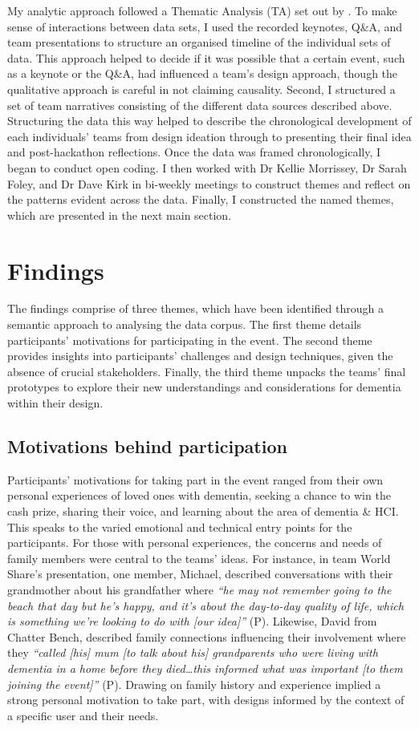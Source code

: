 My analytic approach followed a Thematic Analysis (TA) set out by \cite{braun_one_2020,braun_using_2006}. To make sense of interactions between data sets, I used the recorded keynotes, Q\&A, and team presentations to structure an organised timeline of the individual sets of data. This approach helped to decide if it was possible that a certain event, such as a keynote or the Q\&A, had influenced a team's design approach, though the qualitative approach is careful in not claiming causality. Second, I structured a set of team narratives consisting of the different data sources described above. Structuring the data this way helped to describe the chronological development of each individuals’ teams from design ideation through to presenting their final idea and post-hackathon reflections.  Once the data was framed chronologically, I began to conduct open coding. I then worked with Dr Kellie Morrissey, Dr Sarah Foley, and Dr Dave Kirk in bi-weekly meetings to construct themes and reflect on the patterns evident across the data. Finally, I constructed the named themes, which are presented in the next main section. 

\section{Findings}
\label{sec:Findings}
The findings comprise of three themes, which have been identified through a semantic approach to analysing the data corpus. The first theme details participants’ motivations for participating in the event. The second theme provides insights into participants' challenges and design techniques, given the absence of crucial stakeholders. Finally, the third theme unpacks the teams’ final prototypes to explore their new understandings and considerations for dementia within their design.

\subsection{Motivations behind participation}
\label{ThemeOne:subthemeOne}
Participants’ motivations for taking part in the event ranged from their own personal experiences of loved ones with dementia, seeking a chance to win the cash prize, sharing their voice, and learning about the area of dementia \& HCI. This speaks to the varied emotional and technical entry points for the participants. For those with personal experiences, the concerns and needs of family members were central to the teams’ ideas. For instance, in team World Share’s presentation, one member, Michael, described conversations with their grandmother about his grandfather where \textit{``he may not remember going to the beach that day but he’s happy, and it’s about the day-to-day quality of life, which is something we’re looking to do with [our idea]''} (P). Likewise, David from Chatter Bench, described family connections influencing their involvement where they \textit{``called [his] mum [to talk about his] grandparents who were living with dementia in a home before they died…this informed what was important [to them joining the event]''} (P). Drawing on family history and experience implied a strong personal motivation to take part, with designs informed by the context of a specific user and their needs.  

